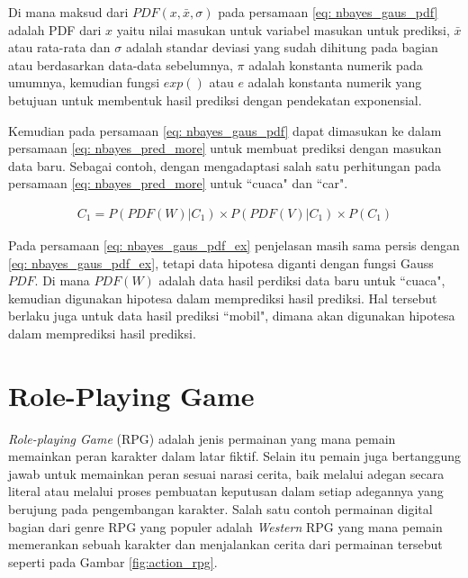 \begin{subs}
\begin{enumerate}[label=\textbf{\arabic*).}]
		Di mana maksud dari $PDF(x, \bar{x}, \sigma)$ pada persamaan \ref{eq: nbayes_gaus_pdf} adalah  PDF dari $x$ yaitu nilai masukan untuk variabel masukan untuk prediksi, $\bar x$ atau rata-rata dan $\sigma$ adalah standar deviasi yang sudah dihitung pada bagian atau berdasarkan data-data sebelumnya, $\pi$ adalah konstanta numerik pada umumnya, kemudian fungsi $exp()$ atau $e$ adalah konstanta numerik yang betujuan untuk membentuk hasil prediksi dengan pendekatan exponensial.
		\vspace{1ex}
		
		Kemudian pada persamaan \ref{eq: nbayes_gaus_pdf} dapat dimasukan ke dalam persamaan \ref{eq: nbayes_pred_more} untuk membuat prediksi dengan masukan data baru. Sebagai contoh, dengan mengadaptasi salah satu perhitungan pada persamaan \ref{eq: nbayes_pred_more} untuk ``cuaca" dan ``car".
		
		\begin{equation}\label{eq: nbayes_gaus_pdf_ex}
		\begin{split}
		C_{1} = P(PDF(W)|C_{1}) \times P(PDF(V)|C_{1}) \times P(C_{1})
		\end{split}
		\end{equation}
		
		Pada persamaan \ref{eq: nbayes_gaus_pdf_ex} penjelasan masih sama persis dengan \ref{eq: nbayes_gaus_pdf_ex}, tetapi data hipotesa diganti dengan fungsi Gauss $PDF$. Di mana $PDF(W)$ adalah data hasil perdiksi data baru untuk ``cuaca", kemudian digunakan hipotesa dalam memprediksi hasil prediksi. Hal tersebut berlaku juga untuk data hasil prediksi ``mobil", dimana akan digunakan hipotesa dalam memprediksi hasil prediksi.
	\end{enumerate}
\end{subs}

\section{Role-Playing Game}
\label{sec:sec2_rpg}
\vspace{1ex}

\textit{Role-playing Game} (RPG) \citep{Panumate2015} adalah jenis permainan yang mana pemain memainkan peran karakter dalam latar fiktif. Selain itu pemain juga bertanggung jawab untuk memainkan peran sesuai narasi cerita, baik melalui adegan secara literal atau melalui proses pembuatan keputusan dalam setiap adegannya yang berujung pada pengembangan karakter. Salah satu contoh permainan digital bagian dari genre RPG yang populer adalah \textit{Western} RPG yang mana pemain memerankan sebuah karakter dan menjalankan cerita dari permainan tersebut seperti pada Gambar \ref{fig:action_rpg}.
\vspace{2ex}

